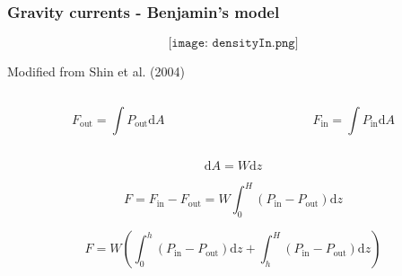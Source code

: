 \documentclass{beamer}
\begin{document}
\begin{frame}
  \frametitle{Gravity currents - Benjamin's model}

  \vspace{-0.75cm}
  
  $$\texttt{[image: densityIn.png]}$$

  \vspace{-0.75cm}

  \begin{center}
  \tiny Modified from Shin et al. (2004)
  \end{center}

  \vspace{-0.75cm}
  
  \begin{columns}[t]

    \begin{column}{0.5\paperwidth}

      $$ F_{\text{out}} = \int P_{\text{out}} \mathrm{d} A $$
      
    \end{column}

    \begin{column}{0.5\paperwidth}

      $$ F_{\text{in}} = \int P_{\text{in}} \mathrm{d} A $$
      
    \end{column}

  \end{columns}

  $$ \mathrm{d}A = W \mathrm{d}z $$

  $$ F = F_{\text{in}} - F_{\text{out}} = W \int_{0}^{H} (P_{\text{in}} - P_{\text{out}}) \mathrm{d}z $$

  $$ F = W \left( \int_{0}^{h} (P_{\text{in}} - P_{\text{out}}) \mathrm{d}z + \int_{h}^{H} (P_{\text{in}} - P_{\text{out}}) \mathrm{d}z \right)$$
\end{frame}
\end{document}
